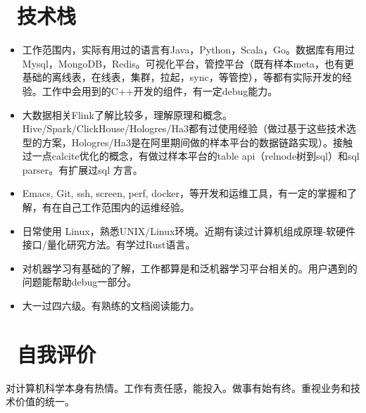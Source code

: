 \documentclass{resume}
\begin{document}
\section{\faCogs\ 技术栈}
\begin{itemize}[parsep=0.5ex]
  \item 工作范围内，实际有用过的语言有Java，Python，Scala，Go。数据库有用过Mysql，MongoDB，Redis。可视化平台，管控平台（既有样本meta，也有更基础的离线表，在线表，集群，拉起，sync，等管控），等都有实际开发的经验。工作中会用到的C++开发的组件，有一定debug能力。
  \item 大数据相关Flink了解比较多，理解原理和概念。Hive/Spark/ClickHouse/Hologres/Ha3都有过使用经验（做过基于这些技术选型的方案，Hologres/Ha3是在阿里期间做的样本平台的数据链路实现）。接触过一点calcite优化的概念，有做过样本平台的table api（relnode树到sql）和sql parser。有扩展过sql 方言。
  \item Emacs, Git, ssh, screen, perf, docker，等开发和运维工具，有一定的掌握和了解，有在自己工作范围内的运维经验。
  \item 日常使用 Linux，熟悉UNIX/Linux环境。近期有读过计算机组成原理-软硬件接口/量化研究方法。有学过Rust语言。
  \item 对机器学习有基础的了解，工作都算是和泛机器学习平台相关的。用户遇到的问题能帮助debug一部分。
  \item 大一过四六级。有熟练的文档阅读能力。

  
\end{itemize}

\section{\faInfo\ 自我评价}
\begin{onehalfspacing}
对计算机科学本身有热情。工作有责任感，能投入。做事有始有终。重视业务和技术价值的统一。
\end{onehalfspacing}

%
%
\end{document}
